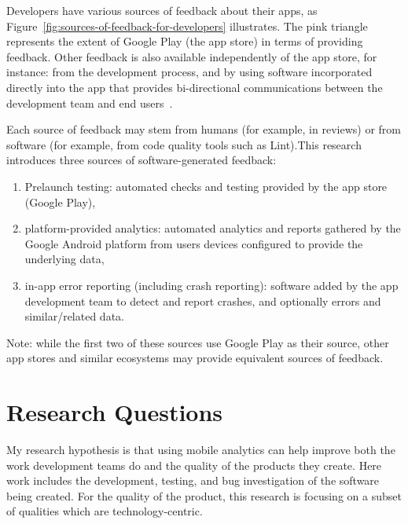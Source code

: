 Developers have various sources of feedback about their apps, as Figure~\ref{fig:sources-of-feedback-for-developers} illustrates. The pink triangle represents the extent of Google Play (the app store) in terms of providing feedback. Other feedback is also available independently of the app store, for instance: from the development process, and by using software incorporated directly into the app that provides bi-directional communications between the development team and end users~\citep{avellis_harty_yu_towards_mobile_twin_peaks}.

\pagebreak

Each source of feedback may stem from humans (for example, in reviews) or from software (for example, from code quality tools such as Lint).This research introduces three sources of software-generated feedback:
\begin{enumerate}
    \itemsep0em 
    \item Prelaunch testing: automated checks and testing provided by the app store (Google Play),
    \item platform-provided analytics: automated analytics and reports gathered by the Google Android platform from users devices configured to provide the underlying data,
    \item in-app error reporting (including crash reporting): software added by the app development team to detect and report crashes, and optionally errors and similar/related data.
\end{enumerate}


Note: while the first two of these sources use Google Play as their source, other app stores and similar ecosystems may provide equivalent sources of feedback.

\section{Research Questions}
\label{section-research-questions}

My research hypothesis is that using mobile analytics can help improve both the work development teams do and the quality of the products they create. Here work includes the development, testing, and bug investigation of the software being created. For the quality of the product, this research is focusing on a subset of qualities which are technology-centric.

